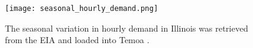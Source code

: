 \begin{figure}[htbp!]
        \begin{center}
               \texttt{[image: seasonal\_hourly\_demand.png]}
        \caption{The seasonal variation in hourly demand in Illinois was retrieved from the \gls{EIA} 
        \cite{us_energy_information_administration_eia_illinois_2020} and 
        loaded into Temoa \cite{decarolis_modelling_2016}.}
        \label{fig:seasonal_hourly_demand}
        \end{center}
\end{figure}

